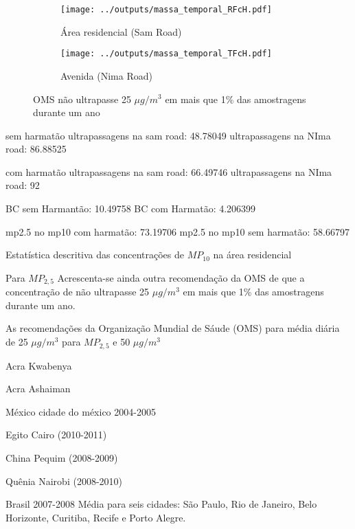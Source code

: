 \begin{figure}[H]
  \centering
  \begin{subfigure}[b]{0.45\textwidth}
    \texttt{[image: ../outputs/massa\_temporal\_RFcH.pdf]}
    \caption{Área residencial (Sam Road)}
  \end{subfigure}%
  \begin{subfigure}[b]{0.45\textwidth}
    \texttt{[image: ../outputs/massa\_temporal\_TFcH.pdf]}
    \caption{Avenida (Nima Road)}
  \end{subfigure}
  \caption{OMS não ultrapasse 25 $\mu g/m^3$ em mais que 1\% das amostragens 
           durante um ano 
          \label{fig:massa_temporal}}
\end{figure}

sem harmatão
ultrapassagens na sam road: 48.78049
ultrapassagens na NIma road: 86.88525

com harmatão
ultrapassagens na sam road: 66.49746
ultrapassagens na NIma road: 92

BC sem Harmantão: 10.49758
BC com Harmatão: 4.206399

mp2.5 no mp10 com harmatão: 73.19706
mp2.5 no mp10 sem harmatão: 58.66797


\begin{table}[H]
  \centering
    
  \caption{Estatística descritiva das concentrações de  $MP_{10}$ na área 
           residencial \label{table:descriptive_fino_sH}}
\end{table}

Para $MP_{2,5}$ Acrescenta-se ainda outra 
recomendação da OMS de que a concentração de  não ultrapasse 25 $\mu g/m^3$ 
em mais que 1\% das amostragens durante um ano.

As recomendações da Organização Mundial de Sáude (OMS) para média diária de 
25 $\mu g/m^3$ para $MP_{2,5}$ e 50 $\mu g/m^3$ 

Acra Kwabenya \citep{aboh2009}

Acra Ashaiman \citep{ofosu2012}

México cidade do méxico 2004-2005 \citep{diaz2014}

Egito Cairo (2010-2011) \citep{boman2013}

China  Pequim (2008-2009) \citep{yang2011}

Quênia Nairobi (2008-2010) \citep{gaita2014}

Brasil 2007-2008 \citep{andrade2012urban} 
Média para seis cidades: São Paulo, Rio de Janeiro, Belo Horizonte, Curitiba, 
Recife e Porto Alegre.


